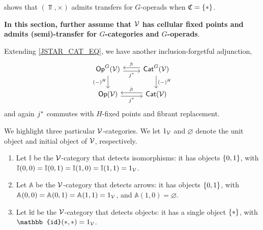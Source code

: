 \documentclass[a4paper,10pt
]{article}%
\newcommand{\I}{\mathbb I}
\renewcommand{\1}{\ensuremath{\mathbb{id}}}
\begin{document}
\begin{example}
      \cite[Theorem 3.1]{GW17} shows that $(\Top, \times)$ admits transfers for $G$-operads when $\mathfrak C = \left\{*\right\}$.
\end{example}

\textbf{\color{OliveGreen} In this section, further assume that $\mathcal V$
  has cellular fixed points and admits (semi)-transfer for $G$-categories and $G$-operads}.

\begin{remark}
      \label{JSTAR_REM}        
      Extending \eqref{JSTAR_CAT_EQ}, we have another inclusion-forgetful adjunction,      
      \begin{equation}
            \begin{tikzcd}
                  \mathsf{Op}^G(\V) \arrow[d, "(-)^H"']
                  \arrow[r, shift right, "j^*"']
                  &
                  \mathsf{Cat}^G(\V) \arrow[l, shift right, swap, "j_!"] \arrow[d, "(-)^H"]
                  \\
                  \Op(\V) \arrow[r, shift right, "j^*"']
                  &
                  \Cat(\V) \arrow[l, shift right, swap, "j_!"]
            \end{tikzcd}
      \end{equation}
      and again $j^{\**}$ commutes with $H$-fixed points and fibrant replacement.
\end{remark}

\begin{definition}
      We highlight three particular $\mathcal V$-categories.
      We let $1_{\mathcal V}$ and $\varnothing$ denote the unit object and initial object of $\mathcal V$, respectively.
      \begin{enumerate}[label = (\roman*)]
      \item Let $\I$ be the $\mathcal V$-category that detects isomorphisms: it has objects $\left\{0,1\right\}$,
            with $\I(0,0) = \I(0,1) = \I(1,0) = \I(1,1) = 1_\V$.
      \item Let $\mathbb A$ be the $\mathcal V$-category that detects arrows: it has objects $\left\{0,1\right\}$,
            with $\mathbb A(0,0) = \mathbb A(0,1) = \mathbb A(1,1) = 1_{\mathcal V}$, and $\mathbb A(1,0) = \varnothing$.
      \item Let $\1$ be the $\mathcal V$-category that detects objects: it has a single object $\set{\**}$, with $\1(\**, \**) = 1_\V$.
      \end{enumerate}
\end{definition}
\end{document}
